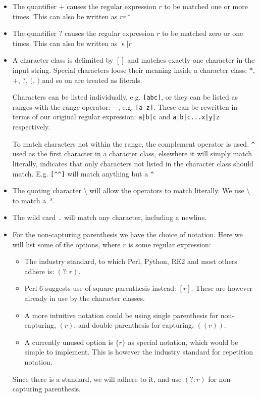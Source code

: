 \begin{itemize}
\item The quantifier $+$ causes the regular expression $r$ to be
  matched one or more times. This can also be written as $rr*$
\item The quantifier $?$ causes the regular expression $r$ to be
  matched zero or one times. This can also be written as
  $\upvarepsilon|r$
\item A character class is delimited by $[]$ and matches exactly one
  character in the input string. Special characters loose their
  meaning inside a character class; $*$, $+$, $?$, $($, $)$ and so on
  are treated as literals.

  Characters can be listed individually, e.g. \texttt{[abc]}, or they
  can be listed as ranges with the range operator: $-$,
  e.g. \texttt{[a-z]}. These can be rewritten in terms of our original
  regular expression: \texttt{a|b|c} and \texttt{a|b|c...x|y|z}
  respectively.

  To match characters not within the range, the complement operator is
  used. \texttt{\^{}} used as the first character in a character
  class, elsewhere it will simply match literally, indicates that only
  characters not listed in the character class should
  match. E.g. \texttt{[\^{}\^{}]} will match anything but a
  \texttt{\^{}}
\item The quoting character \textsf{\textbackslash} will allow the
  operators to match literally. We use \textsf{\textbackslash *} to
  match a \textsl{*}.
\item The wild card \texttt{.} will match any character, including a
  newline.
\item For the non-capturing parenthesis we have the choice of
  notation. Here we will list some of the options, where $r$ is some
  regular expression:
  \begin{itemize}
  \item The industry standard, to which Perl, Python, RE2 and most
    others adhere is: $(?:r)$.
  \item Perl 6 \cite{Wall2002} suggests use of square parenthesis instead:
    $[r]$. These are however already in use by the character classes.
  \item A more intuitive notation could be using single parenthesis
    for non-capturing, $(r)$, and double parenthesis for capturing,
    $((r))$.
  \item A currently unused option is $\{r\}$ as special notation,
    which would be simple to implement. This is however the industry
    standard for repetition notation.
  \end{itemize}
  
  Since there is a standard, we will adhere to it, and use $(?:r)$ for
  non-capturing parenthesis.
\end{itemize}
